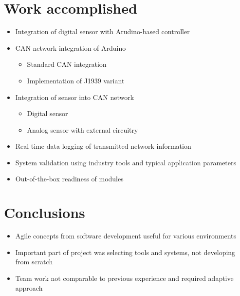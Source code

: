 \documentclass[12pt]{article}
\begin{document}
\section{Work accomplished}
\begin{itemize}
	\item	Integration of digital sensor with Arudino-based controller
	\item	CAN network integration of Arduino
		\begin{itemize}
			\item	Standard CAN integration
			\item	Implementation of J1939 variant
		\end{itemize}
	\item 	Integration of sensor into CAN network
		\begin{itemize}
			\item	Digital sensor
			\item	Analog sensor with external circuitry
		\end{itemize}
	\item	Real time data logging of transmitted network information
	\item	System validation using industry tools and typical
		application parameters
	\item	Out-of-the-box readiness of modules
\end{itemize}

\section{Conclusions}
\begin{itemize}
	\item	Agile concepts from software development useful
		for various environments
	\item	Important part of project was selecting tools and
		systems, not developing from scratch
	\item	Team work not comparable to previous experience and
		required adaptive approach
\end{itemize}	
\end{document}
